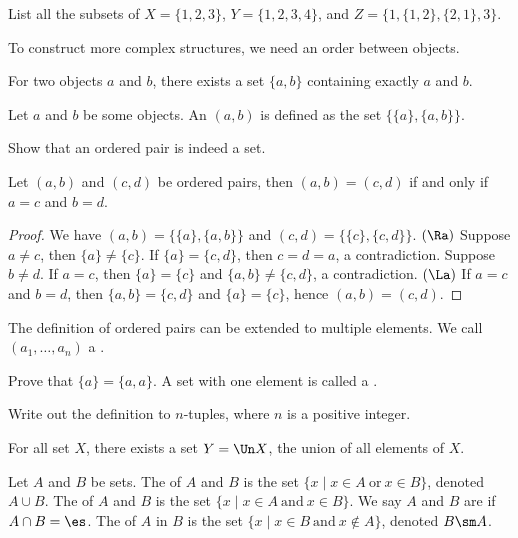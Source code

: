 \documentclass[10pt]{article}
\begin{document}
\begin{problem}
    List all the subsets of $X=\{1,2,3\}$, $Y=\{1,2,3,4\}$, and $Z=\{1,\{1,2\},\{2,1\},3\}$.
\end{problem}
To construct more complex structures, we need an order between objects. 
\begin{Axiom of pairing}
    For two objects $a$ and $b$, there exists a set $\{a,b\}$ containing exactly $a$ and $b$.
\end{Axiom of pairing}
\begin{definition}
    Let $a$ and $b$ be some objects. An  $(a,b)$ is defined as the set $\{\{a\},\{a,b\}\}$.
\end{definition}
\begin{problem}
    Show that an ordered pair is indeed a set.
\end{problem}
\begin{proposition}
    Let $(a,b)$ and $(c,d)$ be ordered pairs, then $(a,b)=(c,d)$ if and only if $a=c$ and $b=d$.
\end{proposition}
\begin{proof}
    We have $(a,b)=\{\{a\},\{a,b\}\}$ and $(c,d)=\{\{c\},\{c,d\}\}$. $(\Ra)$ Suppose $a\ne c$, then $\{a\}\ne\{c\}$. If $\{a\}=\{c,d\}$, then $c=d=a$, a contradiction. Suppose $b\ne d$. If $a=c$, then $\{a\}=\{c\}$ and $\{a,b\}\ne\{c,d\}$, a contradiction. $(\La)$ If $a=c$ and $b=d$, then $\{a,b\}=\{c,d\}$ and $\{a\}=\{c\}$, hence $(a,b)=(c,d)$.
\end{proof}
\par
The definition of ordered pairs can be extended to multiple elements. We call $({a}_{1},\dots,{a}_{n})$ a .
\begin{problem}
    Prove that $\{a\}=\{a,a\}$. A set with one element is called a .
\end{problem}
\begin{problem}
    Write out the definition to $n$-tuples, where $n$ is a positive integer.
\end{problem}
\begin{Axiom of union}
    For all set $X$, there exists a set $Y=\Un X$, the union of all elements of $X$.
\end{Axiom of union}
\begin{definition}
    Let $A$ and $B$ be sets. The  of $A$ and $B$ is the set $\{x\mid x\in A\ \text{or}\ x\in B\}$, denoted $A\cup B$. The  of $A$ and $B$ is the set $\{x\mid x\in A\ \text{and}\ x\in B\}$. We say $A$ and $B$ are  if $A\cap B=\es$. The  of $A$ in $B$ is the set $\{x\mid x\in B\ \text{and}\ x\notin A\}$, denoted $B\sm A$.
\end{definition}
\end{document}
